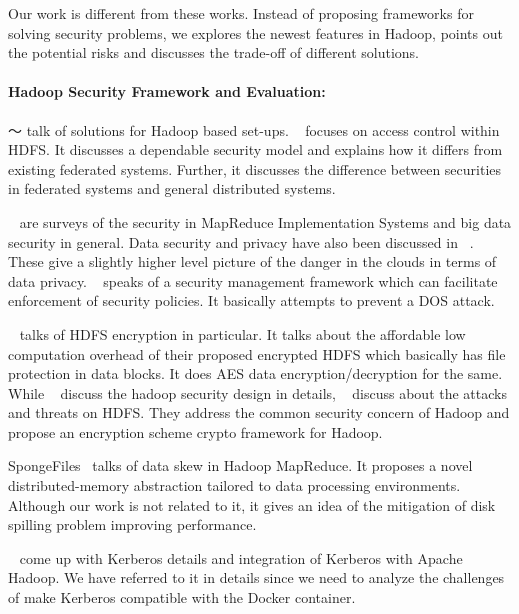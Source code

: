 Our work is different from these works. Instead of proposing frameworks for solving security problems, we explores the newest features in Hadoop, points out the potential risks and discusses the trade-off of different solutions.
\paragraph{Hadoop Security Framework and Evaluation:} ～\cite{zhou2014new,tripathi2013hadoop} talk of solutions for Hadoop based set-ups. ~\cite{reddy2013access} focuses on access control within HDFS. It discusses a dependable security model and explains how it differs from existing federated systems. Further, it discusses the difference between securities in federated systems and general distributed systems.

~\cite{jose2014privacy,shen2010security,subashini2011survey,tankard2012big,zhou2010security} are surveys of the security in MapReduce Implementation Systems and big data security in general. Data security and privacy have also been discussed in ~\cite{madaan2012implementation,tseng2012implement,wei2014security}. These give a slightly higher level picture of the danger in the clouds in terms of data privacy. ~\cite{basescu2011managing} speaks of a security management framework which can facilitate enforcement of security policies. It basically attempts to prevent a DOS attack.

~\cite{park2013secure,encryption} talks of HDFS encryption in particular. It talks about the affordable low computation overhead of their proposed encrypted HDFS which basically has file protection in data blocks. It does AES data encryption/decryption for the same. While ~\cite{o2009hadoop} discuss the hadoop security design in details, ~\cite{cohen2014towards,cohen2013towards,lin2012toward,sujitha2013improving} discuss about the attacks and threats on HDFS. They address the common security concern of Hadoop and propose an encryption scheme crypto framework for Hadoop. 

SpongeFiles~\cite{elmeleegy2014spongefiles} talks of data skew in Hadoop MapReduce. It proposes a novel distributed-memory abstraction tailored to data processing environments. Although our work is not related to it, it gives an idea of the mitigation of disk spilling problem improving performance. 

~\cite{steiner1988kerberos,o2010integrating} come up with Kerberos details and integration of Kerberos with Apache Hadoop. We have referred to it in details since we need to analyze the challenges of make Kerberos compatible with the Docker container.

